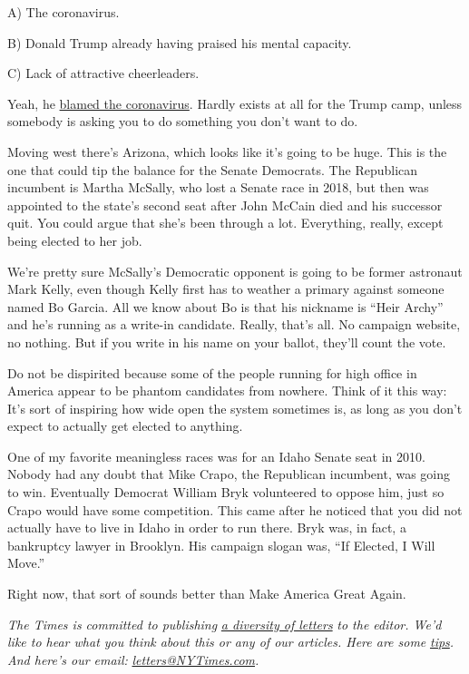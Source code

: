 A) The coronavirus.

B) Donald Trump already having praised his mental capacity.

C) Lack of attractive cheerleaders.

Yeah, he
\href{https://whnt.com/news/tommy-tuberville-says-he-wont-debate-jeff-sessions/}{blamed
the coronavirus}. Hardly exists at all for the Trump camp, unless
somebody is asking you to do something you don't want to do.

Moving west there's Arizona, which looks like it's going to be huge.
This is the one that could tip the balance for the Senate Democrats. The
Republican incumbent is Martha McSally, who lost a Senate race in 2018,
but then was appointed to the state's second seat after John McCain died
and his successor quit. You could argue that she's been through a lot.
Everything, really, except being elected to her job.

We're pretty sure McSally's Democratic opponent is going to be former
astronaut Mark Kelly, even though Kelly first has to weather a primary
against someone named Bo Garcia. All we know about Bo is that his
nickname is ``Heir Archy'' and he's running as a write-in candidate.
Really, that's all. No campaign website, no nothing. But if you write in
his name on your ballot, they'll count the vote.

Do not be dispirited because some of the people running for high office
in America appear to be phantom candidates from nowhere. Think of it
this way: It's sort of inspiring how wide open the system sometimes is,
as long as you don't expect to actually get elected to anything.

One of my favorite meaningless races was for an Idaho Senate seat in
2010. Nobody had any doubt that Mike Crapo, the Republican incumbent,
was going to win. Eventually Democrat William Bryk volunteered to oppose
him, just so Crapo would have some competition. This came after he
noticed that you did not actually have to live in Idaho in order to run
there. Bryk was, in fact, a bankruptcy lawyer in Brooklyn. His campaign
slogan was, ``If Elected, I Will Move.''

Right now, that sort of sounds better than Make America Great Again.

\emph{The Times is committed to publishing}
\href{https://www.nytimes3xbfgragh.onion/2019/01/31/opinion/letters/letters-to-editor-new-york-times-women.html}{\emph{a
diversity of letters}} \emph{to the editor. We'd like to hear what you
think about this or any of our articles. Here are some}
\href{https://help.nytimes3xbfgragh.onion/hc/en-us/articles/115014925288-How-to-submit-a-letter-to-the-editor}{\emph{tips}}\emph{.
And here's our email:}
\href{mailto:letters@NYTimes.com}{\emph{letters@NYTimes.com}}\emph{.}

